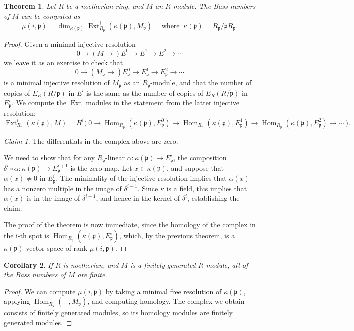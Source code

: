 \documentclass[11pt]{book}
\newtheorem{theorem}{Theorem}[chapter]
\newtheorem{corollary}[theorem]{Corollary}
\numberwithin{equation}{section}
\numberwithin{theorem}{chapter}
\theoremstyle{definition}
\newtheorem*{basic properties}{Basic Properties}
\newtheorem*{Important Remark}{Important Remark}
\theoremstyle{remark}
\newtheorem*{claim*}{Claim}
\newcommand{\p}{\mathfrak{p}}
\newcommand{\Hom}{\operatorname{Hom}}
\newcommand{\Ext}{\operatorname{Ext}}
\renewcommand{\dim}{\operatorname{dim}}
\begin{document}
\begin{theorem}
	Let $R$ be a noetherian ring, and $M$ an $R$-module. The Bass numbers of $M$ can be computed as
	\[\mu(i,\p) = \dim_{\kappa(\p)}\Ext^i_{R_\p}(\kappa(\p), M_{\p}) \quad \text{ where } \ \kappa(\p)=R_\p / \p R_\p.\]
\end{theorem}
\begin{proof}
	Given a minimal injective resolution 
	\[0 \to ( M \to ) E^0 \to E^1 \to E^2 \to \cdots \]
	we leave it as an exercise to check that 
	\[0 \to ( M_\p \to ) E_\p^0 \to E_\p^1 \to E_\p^2 \to \cdots \]
	is a minimal injective resolution of $M_\p$ as an $R_\p$-module, and that the number of copies of $E_R(R/\p)$ in $E^i$ is the same as the number of copies of $E_R(R/\p)$ in $E^i_{\p}$. We compute the $\Ext$ modules in the statement from the latter injective resolution:
	\[ \Ext^i_{R_\p}(\kappa(\p), M) = H^i\Big( \ 0 \to \Hom_{R_\p}(\kappa(\p),E^0_\p) \to \Hom_{R_\p}(\kappa(\p),E^1_\p) \to \Hom_{R_\p}(\kappa(\p),E^2_\p) \to \cdots \ \Big). \]
	
	\begin{claim*}
		The differentials in the complex above are zero.
	\end{claim*}
We need to show that for any $R_\p$-linear $\alpha:\kappa(\p)\to E^i_\p$, the composition $\delta^i \circ \alpha: \kappa(\p) \to E^{i+1}_\p$ is the zero map. Let $x\in \kappa(\p)$, and suppose that $\alpha(x)\neq 0$ in $E^i_\p$. The minimality of the injective resolution implies that $\alpha(x)$ has a nonzero multiple in the image of $\delta^{i-1}$. Since $\kappa$ is a field, this implies that $\alpha(x)$ is in the image of $\delta^{i-1}$, and hence in the kernel of $\delta^i$, establishing the claim.

The proof of the theorem is now immediate, since the homology of the complex in the i-th spot is $\Hom_{R_\p}(\kappa(\p),E^i_\p)$, which, by the previous theorem, is a $\kappa(\p)$-vector space of rank $\mu(i,\p)$.
\end{proof}

\begin{corollary}
	If $R$ is noetherian, and $M$ is a finitely generated $R$-module, all of the Bass numbers of $M$ are finite.
\end{corollary}
\begin{proof}
	We can compute $\mu(i,\p)$ by taking a minimal free resolution of $\kappa(\p)$, applying $\Hom_{R_\p}(-,M_\p)$, and computing homology. The complex we obtain consists of finitely generated modules, so its homology modules are finitely generated modules. 
\end{proof}
\end{document}
